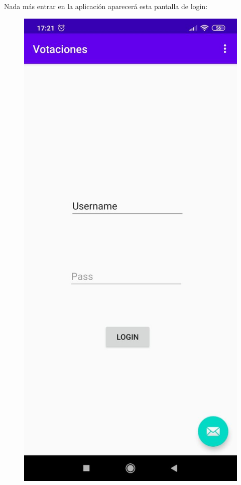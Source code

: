 \documentclass{article}
\begin{document}
 	Nada más entrar en la aplicación aparecerá esta pantalla de login:
 	\begin{figure}[H]
 		\centering
 		\includegraphics[totalheight=8cm]{img/android1}
 	\end{figure}
\end{document}
